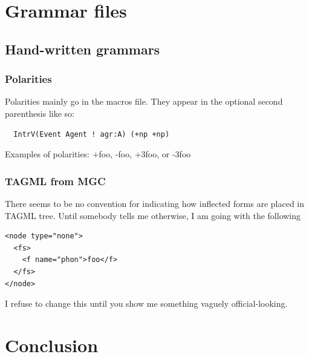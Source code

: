 \documentclass[11pt]{article}
\begin{document}
\section{Grammar files}

\subsection{Hand-written grammars}

\subsubsection{Polarities}

Polarities mainly go in the macros file.  They appear in the optional
second parenthesis like so:

\begin{verbatim}
  IntrV(Event Agent ! agr:A) (+np +np)
\end{verbatim}

Examples of polarities: +foo, -foo, +3foo, or -3foo

\subsubsection{TAGML from MGC}

There seems to be no convention for indicating how inflected 
forms are placed in TAGML tree.  Until somebody tells me 
otherwise, I am going with the following

\begin{verbatim}
<node type="none">
  <fs>
    <f name="phon">foo</f>
  </fs>
</node>
\end{verbatim}

I refuse to change this until you show me something vaguely
official-looking.


\section{Conclusion}

\end{document}
